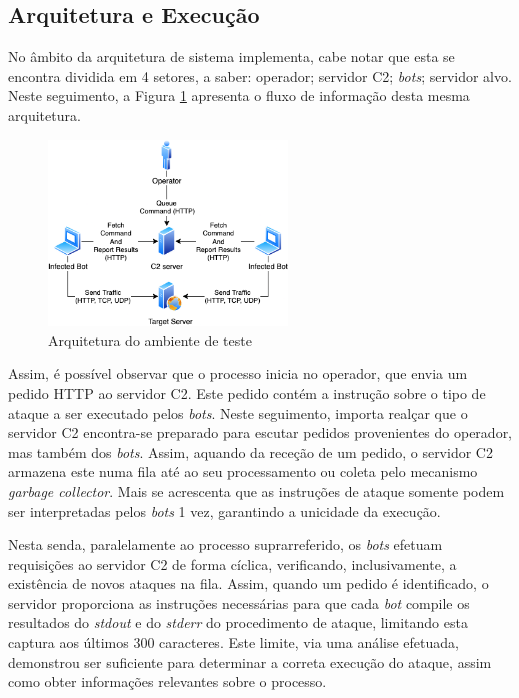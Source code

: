 \subsection{Arquitetura e Execução}
No âmbito da arquitetura de sistema implementa, cabe notar que esta se encontra dividida em 4 setores, a saber: operador; servidor C2; \textit{bots}; servidor alvo. Neste seguimento, a Figura \ref{fig:arquitetura-testes} apresenta o fluxo de informação desta mesma arquitetura.


\begin{figure}[!h]
    \centering
    \includegraphics[width=2.5in]{imgs/architecture_smaller.png}
    \caption{Arquitetura do ambiente de teste}
    \label{fig:arquitetura-testes}
\end{figure}


Assim, é possível observar que o processo inicia no operador, que envia um pedido HTTP ao servidor C2. Este pedido contém a instrução sobre o tipo de ataque a ser executado pelos \textit{bots}. Neste seguimento, importa realçar que o servidor C2 encontra-se preparado para escutar pedidos provenientes do operador, mas também dos \textit{bots}. Assim, aquando da receção de um pedido, o servidor C2 armazena este numa fila até ao seu processamento ou coleta pelo mecanismo \textit{garbage collector}. Mais se acrescenta que as instruções de ataque somente podem ser interpretadas pelos \textit{bots} 1 vez, garantindo a unicidade da execução.

Nesta senda, paralelamente ao processo suprarreferido, os \textit{bots} efetuam requisições ao servidor C2 de forma cíclica, verificando, inclusivamente, a existência de novos ataques na fila. Assim, quando um pedido é identificado, o servidor proporciona as instruções necessárias para que cada \textit{bot} compile os resultados do \textit{stdout} e do \textit{stderr} do procedimento de ataque, limitando esta captura aos últimos 300 caracteres. Este limite, via uma análise efetuada, demonstrou ser suficiente para determinar a correta execução do ataque, assim como obter informações relevantes sobre o processo.


